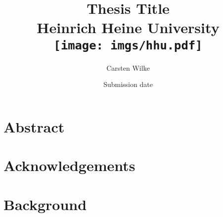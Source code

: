 \documentclass{report}
\title{
{Thesis Title}\\
{\large Heinrich Heine University}\\
{\texttt{[image: imgs/hhu.pdf]}}
}
\author{Carsten Wilke}
\date{Submission date}
\begin{document}
\maketitle

\chapter*{Abstract}


\chapter*{Acknowledgements}


\tableofcontents

\chapter{Background}




\end{document}
